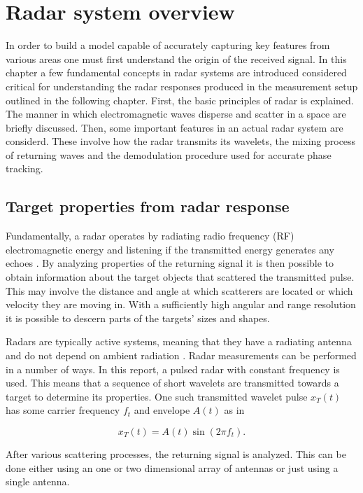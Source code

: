 \chapter{Radar system overview}

In order to build a model capable of accurately capturing key features from various areas one must first understand the origin of the received signal. In this chapter a few fundamental concepts in radar systems are introduced considered critical for understanding the radar responses produced in the measurement setup outlined in the following chapter. First, the basic principles of radar is explained. The manner in which electromagnetic waves disperse and scatter in a space are briefly discussed. Then, some important features in an actual radar system are considerd. These involve how the radar transmits its wavelets, the mixing process of returning waves and the demodulation procedure used for accurate phase tracking. 

\section{Target properties from radar response}

Fundamentally, a radar operates by radiating radio frequency (RF) electromagnetic energy and listening if the transmitted energy generates any echoes \citep{skolnik_2009}. By analyzing properties of the returning signal it is then possible to obtain information about the target objects that scattered the transmitted pulse. This may involve the distance and angle at which scatterers are located or which velocity they are moving in. With a sufficiently high angular and range resolution it is possible to descern parts of the targets' sizes and shapes.  

Radars are typically active systems, meaning that they have a radiating antenna and do not depend on ambient radiation \citep{skolnik_2009}. Radar measurements can be performed in a number of ways. In this report, a pulsed radar with constant frequency is used. This means that a sequence of short wavelets are transmitted towards a target to determine its properties. One such transmitted wavelet pulse $x_T(t)$ has some carrier frequency $f_t$ and envelope $A(t)$ as in

\begin{equation}\label{eq:trans}
	x_T(t)
	= A(t)\sin(2\pi f_t).
\end{equation}

After various scattering processes, the returning signal is analyzed. This can be done either using an one or two dimensional array of antennas or just using a single antenna. 

